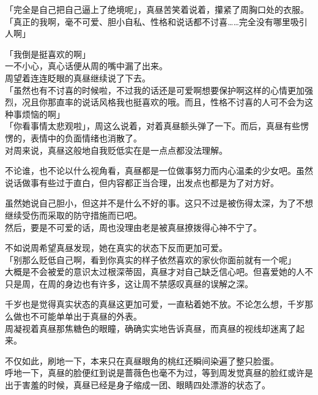 「完全是自己把自己逼上了绝境呢」，真昼苦笑着说着，攥紧了周胸口处的衣服。\\

「真正的我啊，毫不可爱、胆小自私、性格和说话都不讨喜……完全没有哪里吸引人啊」

「我倒是挺喜欢的啊」\\

一不小心，真心话便从周的嘴中漏了出来。\\

周望着连连眨眼的真昼继续说了下去。\\

「虽然也有不讨喜的时候啦，不过我的话还是可爱啊想要保护啊这样的心情更加强烈，况且你那直率的说话风格我也挺喜欢的哦。而且，性格不讨喜的人可不会为这种事烦恼的啊」\\

「你看事情太悲观啦」，周这么说着，对着真昼额头弹了一下。而后，真昼有些愣愣的，表情中的负面情绪也消散了。\\

对周来说，真昼这般地自我贬低实在是一点点都没法理解。

不论谁，也不论以什么视角看，真昼都是一位做事努力而内心温柔的少女吧。虽然说话做事有些过于直白，但内容都正当合理，出发点也都是为了对方好。

虽然她说自己胆小，但这并不是什么不好的事。这只不过是被伤得太深，为了不想继续受伤而采取的防守措施而已吧。\\

然后，要是不可爱的话，周也没理由老是被真昼撩拨得心神不宁了。

不如说周希望真昼发现，她在真实的状态下反而更加可爱。\\

「别那么贬低自己啊，看到你真实的样子依然喜欢的家伙你面前就有一个呢」\\

大概是不会被爱的意识太过根深蒂固，真昼才对自己缺乏信心吧。但喜爱她的人不只是周，在周的身边也有许多，这让周不禁感叹真昼的误解之深。

千岁也是觉得真实状态的真昼这更加可爱，一直粘着她不放。不论怎么想，千岁那么做也不可能单单出于真昼的外表。\\

周凝视着真昼那焦糖色的眼瞳，确确实实地告诉真昼，而真昼的视线却迷离了起来。

不仅如此，刷地一下，本来只在真昼眼角的桃红还瞬间染遍了整只脸蛋。\\

呼地一下，真昼的脸便红到说是蔷薇色也毫不为过，等到周发觉真昼的脸红或许是出于害羞的时候，真昼已经是身子缩成一团、眼睛四处漂游的状态了。\\

